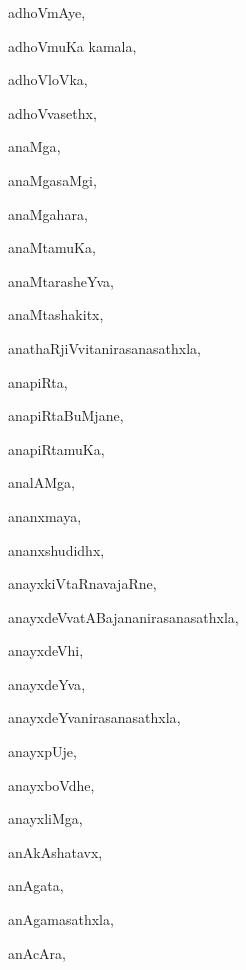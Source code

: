 \begin{multicols}{3}
{\noindent
{adhoVmAye}, \pageref{adhoVmAye}

\noindent
{adhoVmuKa kamala}, \pageref{adhoVmuKa kamala}

\noindent
{adhoVloVka}, \pageref{adhoVloVka}

\noindent
{adhoVvasethx}, \pageref{adhoVvasethx}

\noindent
{anaMga}, \pageref{anaMga}

\noindent
{anaMgasaMgi}, \pageref{anaMgasaMgi}

\noindent
{anaMgahara}, \pageref{anaMgahara}

\noindent
{anaMtamuKa}, \pageref{anaMtamuKa}

\noindent
{anaMtarasheYva}, \pageref{anaMtarasheYva}

\noindent
{anaMtashakitx}, \pageref{anaMtashakitx}

\noindent
{anathaRjiVvitanirasanasathxla}, \pageref{anathaRjiVvitanirasanasathxla}

\noindent
{anapiRta}, \pageref{anapiRta}

\noindent
{anapiRtaBuMjane}, \pageref{anapiRtaBuMjane}

\noindent
{anapiRtamuKa}, \pageref{anapiRtamuKa}

\noindent
{analAMga}, \pageref{analAMga}

\noindent
{ananxmaya}, \pageref{ananxmaya}

\noindent
{ananxshudidhx}, \pageref{ananxshudidhx}

\noindent
{anayxkiVtaRnavajaRne}, \pageref{anayxkiVtaRnavajaRne}

\noindent
{anayxdeVvatABajananirasanasathxla}, \pageref{anayxdeVvatABajananirasanasathxla}

\noindent
{anayxdeVhi}, \pageref{anayxdeVhi}

\noindent
{anayxdeYva}, \pageref{anayxdeYva}

\noindent
{anayxdeYvanirasanasathxla}, \pageref{anayxdeYvanirasanasathxla}

\noindent
{anayxpUje}, \pageref{anayxpUje}

\noindent
{anayxboVdhe}, \pageref{anayxboVdhe}

\noindent
{anayxliMga}, \pageref{anayxliMga}

\noindent
{anAkAshatavx}, \pageref{anAkAshatavx}

\noindent
{anAgata}, \pageref{anAgata}

\noindent
{anAgamasathxla}, \pageref{anAgamasathxla}

\noindent
{anAcAra}, \pageref{anAcAra}

}
\end{multicols}
